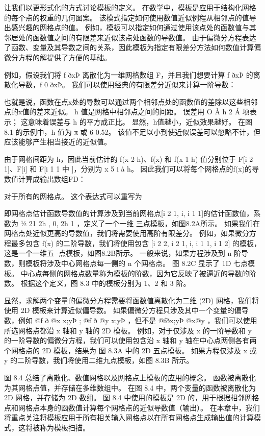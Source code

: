 让我们以更形式化的方式讨论模板的定义。 在数学中，模板是应用于结构化网格的每个点的权重的几何图案。 该模式指定如何使用数值近似例程从相邻点的值导出感兴趣的网格点的值。 例如，模板可以指定如何通过使用该点处的函数值与其邻居处的函数值之间的有限差来近似该点处函数的导数值。 由于偏微分方程表达了函数、变量及其导数之间的关系，因此模板为指定有限差分方法如何数值计算偏微分方程的解提供了方便的基础。

例如，假设我们将 f ðxÞ 离散化为一维网格数组 F，并且我们想要计算 f ðxÞ 的离散化导数，f 0 ðxÞ。 我们可以使用经典的有限差分近似来计算一阶导数：

也就是说，函数在点x处的导数可以通过两个相邻点处的函数值的差除以这些相邻点的x值的差来近似。 h 值是网格中相邻点之间的间距。 误差用 O À h 2 Á 项表示； 这意味着误差与 h 的平方成正比。 显然，h值越小，近似效果越好。 在图 8.1 的示例中，h 值为 π 或 6 0.52。 该值不足以小到使近似误差可以忽略不计，但应该能够产生相当接近的近似值。

由于网格间距为 h，因此当前估计的 f(x 2 h)、f(x) 和 f(x 1 h) 值分别位于 F[i 2 1]、F[i] 和 F[i 1 1 中 ]，分别为 x 5 i à h。 因此我们可以将每个网格点的f(x)的导数值计算成输出数组FD：

对于所有的网格点。 这个表达式可以重写为

即网格点估计函数导数值的计算涉及到当前网格点[i 2 1, i, i 1 1]的估计函数值，系数为 ½ 21 2h , 0, 2h 1 ，定义了一个一维 三点模板，如图8.2A所示。 如果我们在网格点处近似更高的导数值，我们将需要使用高阶有限差分。 例如，如果微分方程最多包含 f(x) 的二阶导数，我们将使用包含 [i 2 2, i 2 1, i, i 1 1, i 1 2] 的模板，这是一个一维五 -点模板，如图8.2B所示。 一般来说，如果方程涉及到 n 阶导数，则模板将涉及中心网格点每一侧的 n 个网格点。 图 8.2C 显示了 1D 七点模板。 中心点每侧的网格点数量称为模板的阶数，因为它反映了被逼近的导数的阶数。 根据这个定义，图 8.3 中的模板分别为 1、2 和 3 阶。

显然，求解两个变量的偏微分方程需要将函数值离散化为二维 (2D) 网格，我们将使用 2D 模板来计算近似偏导数。 如果偏微分方程只涉及其中一个变量的偏导数，例如 @f ð @x x;yÞ ; @f ð @y x;yÞ ，但不是 @fðx;yÞ @x@y ，我们可以使用所选网格点都沿 x 轴和 y 轴的 2D 模板。 例如，对于仅涉及 x 的一阶导数和 y 的一阶导数的偏微分方程，我们可以使用包含沿 x 轴和 y 轴在中心点两侧各有两个网格点的 2D 模板，结果为 图 8.3A 中的 2D 五点模板。 如果方程仅涉及 x 或 y 的二阶导数，我们将使用二维九点模板，如图 8.3B 所示。

图 8.4 总结了离散化、数值网格以及网格点上模板的应用的概念。 函数被离散化为其网格点值，并存储在多维数组中。 在图 8.4 中，两个变量的函数被离散化为 2D 网格，并存储为 2D 数组。 图 8.4 中使用的模板是 2D 的，用于根据相邻网格点和网格点本身的函数值计算每个网格点的近似导数值（输出）。 在本章中，我们将重点关注将模板应用于所有相关输入网格点以在所有网格点生成输出值的计算模式，这将被称为模板扫描。

